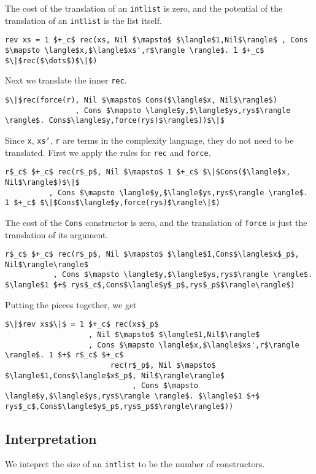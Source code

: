 The cost of the translation of an \texttt{intlist} is zero, and the potential of the translation of an \texttt{intlist} is the list itself.
\begin{lstlisting}
rev xs = 1 $+_c$ rec(xs, Nil $\mapsto$ $\langle$1,Nil$\rangle$ , Cons $\mapsto \langle$x,$\langle$xs',r$\rangle \rangle$. 1 $+_c$ $\|$rec($\dots$)$\|$)
\end{lstlisting}

Next we translate the inner \texttt{rec}.
\begin{lstlisting}
$\|$rec(force(r), Nil $\mapsto$ Cons($\langle$x, Nil$\rangle$)
                , Cons $\mapsto \langle$y,$\langle$ys,rys$\rangle \rangle$. Cons$\langle$y,force(rys)$\rangle$))$\|$
\end{lstlisting}

Since \texttt{x}, \texttt{xs'}, \texttt{r} are terms in the complexity language, they do not need to be translated.
First we apply the rules for \texttt{rec} and \texttt{force}.
\begin{lstlisting}
r$_c$ $+_c$ rec(r$_p$, Nil $\mapsto$ 1 $+_c$ $\|$Cons($\langle$x, Nil$\rangle$)$\|$
          , Cons $\mapsto \langle$y,$\langle$ys,rys$\rangle \rangle$. 1 $+_c$ $\|$Cons$\langle$y,force(rys)$\rangle\|$)
\end{lstlisting}

The cost of the \texttt{Cons} constructor is zero, and the translation of \texttt{force} is just the translation of its argument.
\begin{lstlisting}
r$_c$ $+_c$ rec(r$_p$, Nil $\mapsto$ $\langle$1,Cons$\langle$x$_p$, Nil$\rangle\rangle$
           , Cons $\mapsto \langle$y,$\langle$ys,rys$\rangle \rangle$. $\langle$1 $+$ rys$_c$,Cons$\langle$y$_p$,rys$_p$$\rangle\rangle$)
\end{lstlisting}

Putting the pieces together, we get

\begin{lstlisting}[frame=single]
$\|$rev xs$\|$ = 1 $+_c$ rec(xs$_p$
                   , Nil $\mapsto$ $\langle$1,Nil$\rangle$
                   , Cons $\mapsto \langle$x,$\langle$xs',r$\rangle \rangle$. 1 $+$ r$_c$ $+_c$
                        rec(r$_p$, Nil $\mapsto$ $\langle$1,Cons$\langle$x$_p$, Nil$\rangle\rangle$
                             , Cons $\mapsto \langle$y,$\langle$ys,rys$\rangle \rangle$. $\langle$1 $+$ rys$_c$,Cons$\langle$y$_p$,rys$_p$$\rangle\rangle$))
\end{lstlisting}


\subsection*{Interpretation}
We intepret the size of an \texttt{intlist} to be the number of constructors.

